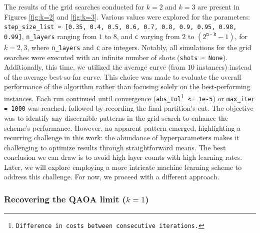 The results of the grid searches conducted for $k=2$ and $k=3$ are present in Figures \ref{fig:k=2} and \ref{fig:k=3}. Various values were explored for the parameters: \texttt{step\_size\_list = [0.35, 0.4, 0.5, 0.6, 0.7, 0.8, 0.9, 0.95, 0.98, 0.99]}, \texttt{n\_layers} ranging from $1$ to $8$, and \texttt{c} varying from $2$ to $(2^{\texttt{n - k}} - 1)$, for $k=2, 3$, where \texttt{n\_layers} and \texttt{c} are integers. Notably, all simulations for the grid searches were executed with an infinite number of shots (\texttt{shots = None}). Additionally, this time, we utilized the average curve (from $10$ instances) instead of the average best-so-far curve. This choice was made to evaluate the overall performance of the algorithm rather than focusing solely on the best-performing instances. Each run continued until convergence (\texttt{abs\_tol\footnote{Difference in costs between consecutive iterations.} <= 1e-5}) or \texttt{max\_iter = 1000} was reached, followed by recording the final partition's cut. The objective was to identify any discernible patterns in the grid search to enhance the scheme's performance. However, no apparent pattern emerged, highlighting a recurring challenge in this work: the abundance of hyperparameters makes it challenging to optimize results through straightforward means. The best conclusion we can draw is to avoid high layer counts with high learning rates. Later, we will explore employing a more intricate machine learning scheme to address this challenge. For now, we proceed with a different approach.








\vspace{-2.5mm}
\subsubsection*{Recovering the QAOA limit ($k = 1$)}
\label{subsubsection:QAOA-Limit_iQAQE}

